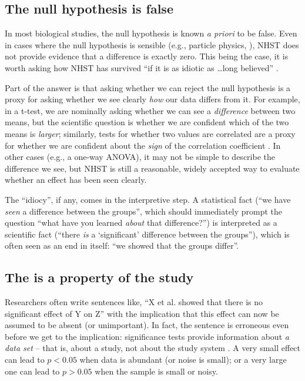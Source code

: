 \subsection*{The null hypothesis is false}

\noindent In most biological studies, the null hypothesis is known \emph{a priori} to be false. Even in cases where the null hypothesis is sensible (e.g., particle physics, \cite{Staley2017}), NHST does not provide evidence that a difference is exactly zero. This being the case, it is worth asking how NHST has survived ``if it is as idiotic as \ldots long believed'' \citet[cited in \cite{Kramer2011}]{ZiliakandMcCloskey2008}.

Part of the answer is that asking whether we can reject the null hypothesis is a proxy for asking whether we see clearly \emph{how} our data differs from it. For example, in a t-test, we are nominally asking whether we can see a \emph{difference} between two means, but the scientific question is whether we are confident which of the two means is \emph{larger}; similarly, tests for whether two values are correlated are a proxy for whether we are confident about the \emph{sign} of the correlation coefficient \citep{robinson2001past}. In other cases (e.g., a one-way ANOVA), it may not be simple to describe the difference we see, but NHST is still a reasonable, widely accepted way to evaluate whether an effect has been seen clearly.

The ``idiocy'', if any, comes in the interpretive step. A statistical fact (``we have \emph{seen} a difference between the groups'', which should immediately prompt the question ``what have you learned \emph{about} that difference?'') is interpreted as a scientific fact (``there \emph{is} a `significant' difference between the groups''), which is often seen as an end in itself: ``we showed that the groups differ''.

\subsection*{The \pval is a property of the study}

\noindent Researchers often write sentences like, ``X et al. showed that there is no significant effect of Y on Z'' with the implication that this effect can now be assumed to be absent (or unimportant). In fact, the sentence is erroneous even before we get to the implication: significance tests provide information about \emph{a data set} -- that is, about a study, not about the study system \citep{HoenigandHeisey2001}. A very small effect can lead to $p < 0.05$ when data is abundant (or noise is small); or a very large one can lead to $p > 0.05$ when the sample is small or noisy. 

